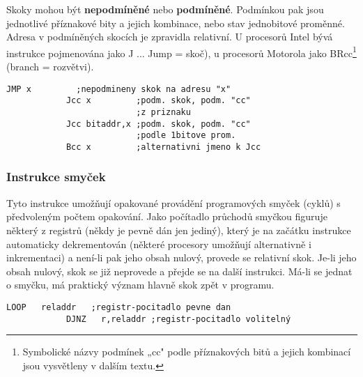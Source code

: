           Skoky mohou být \textbf{nepodmíněné} nebo \textbf{podmíněné}. Podmínkou pak jsou 
          jednotlivé příznakové bity a jejich kombinace, nebo stav jednobitové proměnné. Adresa v 
          podmíněných skocích je zpravidla relativní. U procesorů Intel bývá instrukce pojmenována 
          jako J ... Jump = skoč), u procesorů Motorola jako BRcc\footnote{Symbolické názvy 
          podmínek „cc" podle příznakových bitů a jejich kombinací jsou vysvětleny v dalším textu.} 
          (branch = rozvětvi).
          \begin{lstlisting}[style=luaMITASMStyle]
            JMP x         ;nepodmineny skok na adresu "x"
            Jcc x         ;podm. skok, podm. "cc" 
                          ;z priznaku 
            Jcc bitaddr,x ;podm. skok, podm. "cc" 
                          ;podle 1bitove prom.
            Bcc x         ;alternativni jmeno k Jcc
          \end{lstlisting}
          
        \subsubsection{Instrukce smyček}
          Tyto instrukce umožňují opakované provádění programových smyček (cyklů) s předvoleným 
          počtem opakování. Jako počítadlo průchodů smyčkou figuruje některý z registrů (někdy je 
          pevně dán jen jediný), který je na začátku instrukce automaticky dekrementován 
          (některé procesory umožňují alternativně i inkrementaci) a není-li pak jeho obsah nulový, 
          provede se relativní skok. Je-li jeho obsah nulový, skok se již neprovede a přejde se na 
          další instrukci. Má-li se jednat o smyčku, má praktický význam hlavně skok zpět v 
          programu.
          \begin{lstlisting}[style=luaMITASMStyle]
            LOOP   reladdr   ;registr-pocitadlo pevne dan 
            DJNZ   r,reladdr ;registr-pocitadlo volitelný
          \end{lstlisting}
          
